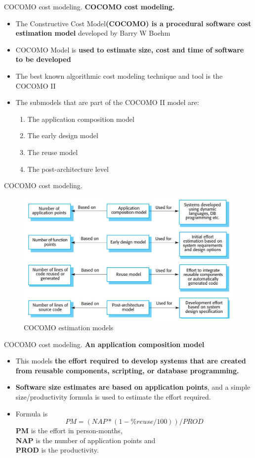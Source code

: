 \documentclass{beamer}
\begin{document}
\begin{frame}{COCOMO cost modeling. }
\textbf{COCOMO cost modeling.}
\begin{itemize}
	\item The Constructive Cost Model\textbf{(COCOMO) is a procedural software cost estimation model} developed by Barry W Boehm
	\item COCOMO Model is\textbf{ used to estimate size, cost and time of software to be developed}
	\item The best known algorithmic cost modeling technique and tool is the COCOMO II
	\item The submodels that are part of the COCOMO II model are:
	\begin{enumerate}
		\item The application composition model
		\item The early design model
		\item The reuse model
		\item The post-architecture level

	\end{enumerate}
\end{itemize}
\end{frame}
\begin{frame}{COCOMO cost modeling. }
		\begin{figure}
			\includegraphics[scale=.5]{img/m4_8}
			\caption{COCOMO 
				estimation models
			}
		\end{figure}
\end{frame}
\begin{frame}{COCOMO cost modeling. }
\textbf{An application composition model}
\begin{itemize}
	\item This models \textbf{the effort required to develop 
		systems that are created from reusable components, scripting, or database programming.}
	\item \textbf{Software size estimates are based on application points}, and a simple size/productivity formula is used to estimate the effort required.
	\item Formula is
	 $$ PM = (NAP * (1 - \%reuse/100)) / PROD $$
	 \textbf{PM} is the effort in person-months,\\
	 \textbf{NAP} is the number of application points and\\
	 \textbf{PROD} is the productivity.
\end{itemize}
\end{frame}
\end{document}
